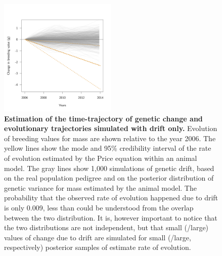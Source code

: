 \begin{figure}[ht]
\centering
\includegraphics[width=0.5\textwidth]{FiguresStasis/DriftComp-1}
\caption{\footnotesize \textbf{Estimation of the time-trajectory of genetic change and evolutionary trajectories simulated with drift only.} Evolution of breeding values for mass are shown relative to the year 2006. The yellow lines show the mode and 95\% credibility interval of the rate of evolution estimated by the Price equation within an animal model. The gray lines show 1,000 simulations of genetic drift, based on the real population pedigree and on the posterior distribution of genetic variance for mass estimated by the animal model. The probability that the observed rate of evolution happened due to drift is only 0.009, less than could be understood from the overlap between the two distribution. It is, however important to notice that the two distributions are not independent, but that small (/large) values of change due to drift are simulated for small (/large, respectively) posterior samples of estimate rate of evolution.}
\label{fig:driftcomp}
\end{figure} 


